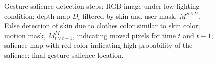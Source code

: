 \documentclass{sigchi}
\begin{document}
\begin{figure}[tb]
\centering
\hspace{-0.6em}%
\caption{Gesture salience detection steps:  RGB image under low lighting condition;
 depth map $D_t$ filtered by skin and user mask, $M^{S\wedge U}$. False detection of skin due to
clothes color similar to skin color;  motion mask,  $M_{t\vee t-1}^M$, indicating moved pixels for time $t$ and $t-1$;
 salience map with red color indicating high probability of the salience;  final gesture salience location.}
\label{fig:gesture-salience}
\end{figure}
\end{document}
